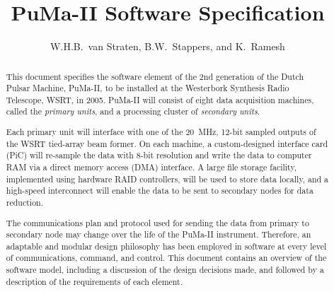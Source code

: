 \documentclass{scrreprt}
\begin{document}
\title{PuMa-II Software Specification}

\author{W.H.B.\ van Straten, B.W.\ Stappers, and K.\ Ramesh}

\maketitle
\tableofcontents{}

\begin{abstract}
This document specifies the software element of the 2nd generation of
the Dutch Pulsar Machine, PuMa-II, to be installed at the Westerbork
Synthesis Radio Telescope, WSRT, in 2005.  PuMa-II will consist of
eight data acquisition machines, called the \emph{primary units}, and
a processing cluster of \emph{secondary units}.

Each primary unit will interface with one of the 20\, MHz, 12-bit
sampled outputs of the WSRT tied-array beam former.  On each machine,
a custom-designed interface card (PiC) will re-sample the data with
8-bit resolution and write the data to computer RAM via a direct
memory access (DMA) interface.  A large file storage facility,
implemented using hardware RAID controllers, will be used to store
data locally, and a high-speed interconnect will enable the data to be
sent to secondary nodes for data reduction.

The communications plan and protocol used for sending the data from
primary to secondary node may change over the life of the PuMa-II
instrument.  Therefore, an adaptable and modular design philosophy has
been employed in software at every level of communications, command,
and control.  This document contains an overview of the software
model, including a discussion of the design decisions made, and
followed by a description of the requirements of each element.

\end{abstract}








\end{document}
